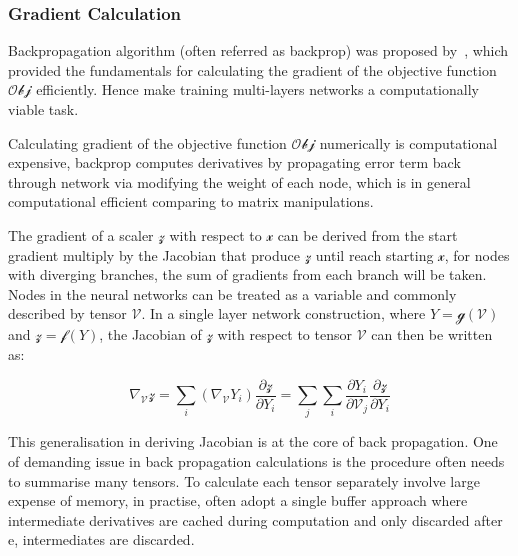 \subsubsection{Gradient Calculation}
Backpropagation algorithm (often referred as backprop) was proposed by~\citet{werbos1975beyond}, which provided the fundamentals for calculating the gradient of the objective function $\mathcal{Obj}$ efficiently. Hence make training multi-layers networks a computationally viable task. 
\par
Calculating gradient of the objective function $\mathcal{Obj}$ numerically is computational expensive, backprop computes derivatives by propagating error term back through network via modifying the weight of each node, which is in general computational efficient comparing to matrix manipulations. 
\par
The gradient of a scaler $\mathcal{z}$ with respect to $\mathcal{x}$ can be derived from the start gradient multiply by the Jacobian that produce $\mathcal{z}$ until reach starting $\mathcal{x}$, for nodes with diverging branches, the sum of gradients from each branch will be taken. Nodes in the neural networks can be treated as a variable and commonly described by tensor $\mathcal{V}$. In a single layer network construction, where $Y=\mathcal{g}(\mathcal{V})$ and $\mathcal{z} = \mathcal{f}(Y)$, the Jacobian of $\mathcal{z}$ with respect to tensor $\mathcal{V}$ can then be written as:

\begin{equation}
    \nabla_{\mathcal{V}}\mathcal{z} = \sum_i (\nabla_{\mathcal{\mathcal{V}}} Y_i)\frac{\partial\mathcal{z}}{\partial Y_i} = \sum_j \sum_i \frac{\partial Y_i} {\partial{\mathcal{V}}_j}\frac{\partial\mathcal{z}}{\partial Y_i}
\end{equation}

This generalisation in deriving Jacobian is at the core of back propagation. One of demanding issue in back propagation calculations is the procedure often needs to summarise many tensors. To calculate each tensor separately involve large expense of memory, in practise, often adopt a single buffer approach where intermediate derivatives are cached during computation and only discarded after e, intermediates are discarded. 